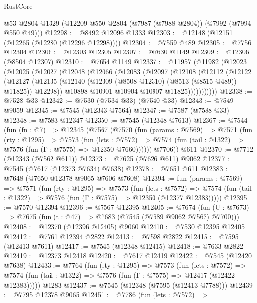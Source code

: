 \begin{lexlean}{RustCore}
\begin{coremodule}
    @53
    @2804
    @1329
    (@12209 @550 @2804 (@7987 (@7988 @2804)) (@7992 (@7994 @550 @49)))
@12298 := @8492 @12096 @1333
@12303 := @12148 (@12151 (@12265 (@12280 (@12296 @12298))))
@12304 := @7559 @489
@12305 := @7756 @12304
@12306 := @12303 @12305
@12307 := @7630 @1149
@12309 := @12306 (@8504 @12307)
@12310 := @7654 @1149
@12337 := @11957
    (@11982
      (@12023
        (@12025
          (@12027
            (@12048
              (@12066
                (@12083
                  (@12097
                    (@12108
                      (@12112
                        (@12122
                          (@12127
                            (@12135
                              (@12140 (@12309 (@8508 @12310) (@8513 (@8515 @489)) @11825))
                              @12298))
                          @10898
                          @10901
                          @10904
                          @10907
                          @11825)))))))))))
@12338 := @7528 @33
@12342 := @7530 (@7534 @33) (@7540 @33)
@12343 := @7549 @9059
@12345 := @7545 (@12343 @7564)
@12347 := @7587 (@7588 @33)
@12348 := @7583 @12347
@12350 := @7545 (@12348 @7613)
@12367 := @7544
    (fun (fn : @7) =>
    @12345
      (@7567
        (@7570
          (fun (params : @7569) =>
          @7571
            (fun (rty : @1295) =>
            @7573
              (fun (lets : @7572) =>
              @7574 (fun (tail : @1322) => @7576 (fun (Γ : @7575) => @12350 @7660))))))
        @7706))
    @611
@12370 := @7712 (@12343 (@7562 @611))
@12373 := @7625 (@7626 @611) @9062
@12377 := @7545 (@7617 (@12373 @7634) @7638)
@12378 := @7651 @611
@12383 := @7648 (@7650 @12378 @9065 @7606 @7608)
@12394 := fun (params : @7569) =>
  @7571
    (fun (rty : @1295) =>
    @7573
      (fun (lets : @7572) =>
      @7574 (fun (tail : @1322) => @7576 (fun (Γ : @7575) => @12350 (@12377 @12383)))))
@12395 := @7570 @12394
@12396 := @7567 @12395
@12405 := @7674
    (fun (U : @7673) => @7675 (fun (t : @47) => @7683 (@7545 (@7689 @9062 @7563) @7700)))
@12408 := @12370 (@12396 @12405) @9060
@12410 := @7530 @12395 @12405
@12412 := @7761 @12394 @2822
@12413 := @7598 @2822
@12415 := @7595 (@12413 @7611)
@12417 := @7545 (@12348 @12415)
@12418 := @7633 @2822
@12419 := @12373 @12418
@12420 := @7617 @12419
@12422 := @7545 (@12420 @7638)
@12433 := @7764
    (fun (rty : @1295) =>
    @7573
      (fun (lets : @7572) =>
      @7574 (fun (tail : @1322) => @7576 (fun (Γ : @7575) => @12417 (@12422 @12383)))))
    @1283
@12437 := @7545 (@12348 (@7595 (@12413 @7788)))
@12439 := @7795 @12378 @9065
@12451 := @7786
    (fun (lets : @7572) =>

\end{coremodule}
\end{lexlean}

